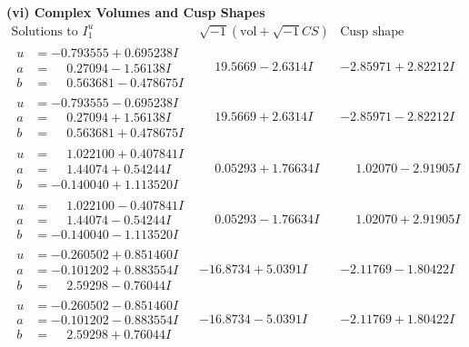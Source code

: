 \documentclass[1p]{elsarticle_modified}
\theoremstyle{definition}
\newcommand{\I}{\sqrt{-1}}
\begin{document}
\newpage\flushleft \textbf{(vi) Complex Volumes and Cusp Shapes}
$$\begin{array}{c|c|c}  
\text{Solutions to }I^u_{1}& \I (\text{vol} + \sqrt{-1}CS) & \text{Cusp shape}\\
 \hline 
\begin{aligned}
u &= -0.793555 + 0.695238 I \\
a &= \phantom{-}0.27094 - 1.56138 I \\
b &= \phantom{-}0.563681 - 0.478675 I\end{aligned}
 & \phantom{-}19.5669 - 2.6314 I & -2.85971 + 2.82212 I \\ \hline\begin{aligned}
u &= -0.793555 - 0.695238 I \\
a &= \phantom{-}0.27094 + 1.56138 I \\
b &= \phantom{-}0.563681 + 0.478675 I\end{aligned}
 & \phantom{-}19.5669 + 2.6314 I & -2.85971 - 2.82212 I \\ \hline\begin{aligned}
u &= \phantom{-}1.022100 + 0.407841 I \\
a &= \phantom{-}1.44074 + 0.54244 I \\
b &= -0.140040 + 1.113520 I\end{aligned}
 & \phantom{-}0.05293 + 1.76634 I & \phantom{-}1.02070 - 2.91905 I \\ \hline\begin{aligned}
u &= \phantom{-}1.022100 - 0.407841 I \\
a &= \phantom{-}1.44074 - 0.54244 I \\
b &= -0.140040 - 1.113520 I\end{aligned}
 & \phantom{-}0.05293 - 1.76634 I & \phantom{-}1.02070 + 2.91905 I \\ \hline\begin{aligned}
u &= -0.260502 + 0.851460 I \\
a &= -0.101202 + 0.883554 I \\
b &= \phantom{-}2.59298 - 0.76044 I\end{aligned}
 & -16.8734 + 5.0391 I & -2.11769 - 1.80422 I \\ \hline\begin{aligned}
u &= -0.260502 - 0.851460 I \\
a &= -0.101202 - 0.883554 I \\
b &= \phantom{-}2.59298 + 0.76044 I\end{aligned}
 & -16.8734 - 5.0391 I & -2.11769 + 1.80422 I \\ \hline\begin{aligned}

\end{aligned}
\end{array}$$
\end{document}
